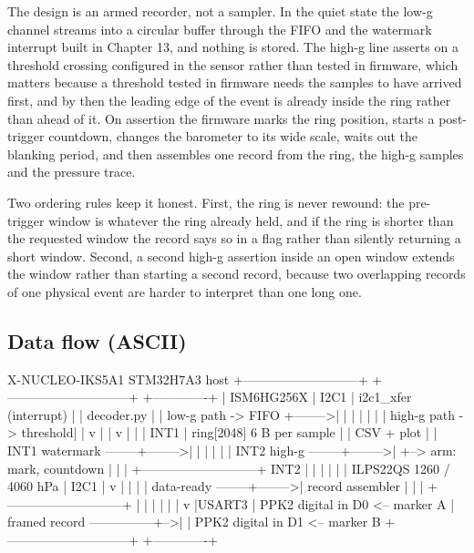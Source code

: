 
The design is an armed recorder, not a sampler. In the quiet state the low-g
channel streams into a circular buffer through the FIFO and the watermark
interrupt built in Chapter 13, and nothing is stored. The high-g line asserts on
a threshold crossing configured in the sensor rather than tested in firmware,
which matters because a threshold tested in firmware needs the samples to have
arrived first, and by then the leading edge of the event is already inside the
ring rather than ahead of it. On assertion the firmware marks the ring position,
starts a post-trigger countdown, changes the barometer to its wide scale, waits
out the blanking period, and then assembles one record from the ring, the high-g
samples and the pressure trace.

Two ordering rules keep it honest. First, the ring is never rewound: the
pre-trigger window is whatever the ring already held, and if the ring is shorter
than the requested window the record says so in a flag rather than silently
returning a short window. Second, a second high-g assertion inside an open
window extends the window rather than starting a second record, because two
overlapping records of one physical event are harder to interpret than one long
one.

\subsection*{Data flow (ASCII)}

\begin{asciiart}
  X-NUCLEO-IKS5A1                       STM32H7A3                         host
  +---------------------------+         +-----------------------------+   +-------------+
  | ISM6HG256X                |  I2C1   | i2c1_xfer (interrupt)       |   | decoder.py  |
  |   low-g path  -> FIFO     +-------->|   |                         |   |   |         |
  |   high-g path -> threshold|         |   v                         |   |   v         |
  |                           |  INT1   | ring[2048] 6 B per sample   |   | CSV + plot  |
  |   INT1 watermark  --------+-------->|   |                         |   |             |
  |   INT2 high-g     --------+-------->|   +--> arm: mark, countdown  |   |             |
  +---------------------------+  INT2   |        |                    |   |             |
  | ILPS22QS 1260 / 4060 hPa  |  I2C1   |        v                    |   |             |
  |   data-ready      --------+-------->| record assembler            |   |             |
  +---------------------------+         |   |                         |   |             |
                                        |   v                         |USART3           |
  PPK2 digital in D0 <-- marker A       | framed record ---------------+-->|             |
  PPK2 digital in D1 <-- marker B       +-----------------------------+   +-------------+
\end{asciiart}


